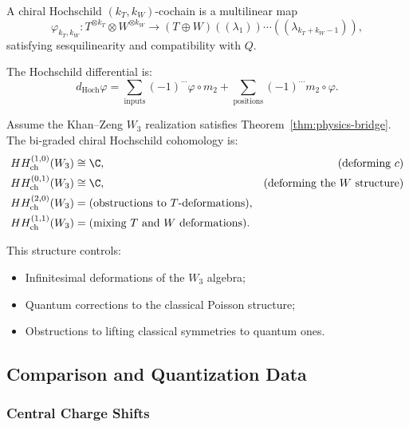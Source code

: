 \begin{definition}
A chiral Hochschild $(k_T, k_W)$-cochain is a multilinear map
\begin{equation}
\varphi_{k_T, k_W}: T^{\otimes k_T} \otimes W^{\otimes k_W} \to (T \oplus W)((\lambda_1))\cdots((\lambda_{k_T+k_W-1})),
\end{equation}
satisfying sesquilinearity and compatibility with $Q$.
\end{definition}

The Hochschild differential is:
\begin{equation}
d_{\text{Hoch}} \varphi = \sum_{\text{inputs}} (-1)^{\cdots} \varphi \circ m_2 + \sum_{\text{positions}} (-1)^{\cdots} m_2 \circ \varphi.
\end{equation}

\begin{proposition}
Assume the Khan--Zeng $W_3$ realization satisfies
Theorem~\ref{thm:physics-bridge}.
The bi-graded chiral Hochschild cohomology is:
\begin{align}
HH^{(1,0)}_{\text{ch}}(W_3) &\cong \C, & \text{(deforming $c$)}\\
HH^{(0,1)}_{\text{ch}}(W_3) &\cong \C, & \text{(deforming the $W$ structure)}\\
HH^{(2,0)}_{\text{ch}}(W_3) &= \text{(obstructions to } T \text{-deformations)},\\
HH^{(1,1)}_{\text{ch}}(W_3) &= \text{(mixing } T \text{ and } W \text{ deformations)}.
\end{align}
\end{proposition}

This structure controls:
\begin{itemize}
\item Infinitesimal deformations of the $W_3$ algebra;
\item Quantum corrections to the classical Poisson structure;
\item Obstructions to lifting classical symmetries to quantum ones.
\end{itemize}

\subsection{Comparison and Quantization Data}

\subsubsection{Central Charge Shifts}

